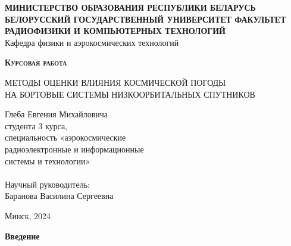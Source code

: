 ﻿\documentclass[14pt, a4paper]{extreport}
\begin{document}
\begin{titlepage}
	\begin{center}
		\Large \textbf{МИНИСТЕРСТВО ОБРАЗОВАНИЯ РЕСПУБЛИКИ БЕЛАРУСЬ БЕЛОРУССКИЙ ГОСУДАРСТВЕННЫЙ УНИВЕРСИТЕТ
			ФАКУЛЬТЕТ РАДИОФИЗИКИ И КОМПЬЮТЕРНЫХ ТЕХНОЛОГИЙ
		} \\
		Кафедра физики и аэрокосмических технологий
	\end{center}

	\vspace{5em}

	\begin{center}
		\Huge \textsc{\textbf{Курсовая работа}}
	\end{center}

	\begin{center}
		\Large МЕТОДЫ ОЦЕНКИ ВЛИЯНИЯ КОСМИЧЕСКОЙ ПОГОДЫ \\
		НА БОРТОВЫЕ СИСТЕМЫ НИЗКООРБИТАЛЬНЫХ СПУТНИКОВ
	\end{center}

	\vspace{2em}

	\hfill
	\parbox{14em}{
		Глеба Евгения Михайловича \\
		студента 3 курса, \\
		специальность «аэрокосмические \\
		радиоэлектронные и информационные \\
		системы и технологии» \\
		\\
		Научный руководитель: \\
		Баранова Василина Сергеевна \\
	}


	\begin{center}
		Минск, 2024
	\end{center}

\end{titlepage}

{\Large \textbf{Введение}}
\end{document}
